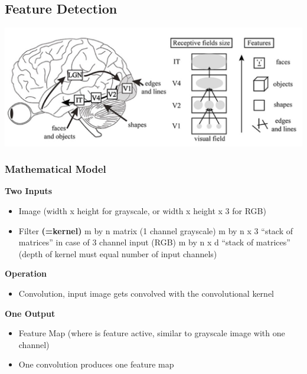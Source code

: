 \documentclass[a4paper, landscape, 10pt]{scrartcl}
\begin{document}
\begin{multicols*}{3}
        \subsection{Feature Detection}
        \includegraphics[width=\columnwidth]{graphic/00-brain-feature-detectors}

        \subsubsection{Mathematical Model}
        \textbf{Two Inputs}
        \begin{itemize}
            \item Image (width x height for grayscale, or width x height x 3 for RGB)
            \item Filter \textbf{(=kernel)}
            \subitem m by n matrix (1 channel grayscale)
            \subitem m by n x 3 \enquote{stack of matrices} in case of 3 channel input (RGB)
            \subitem m by n x d \enquote{stack of matrices} (depth of kernel must equal number of input channels)
        \end{itemize}
        \textbf{Operation}
        \begin{itemize}
            \item Convolution, input image gets convolved with the convolutional kernel
        \end{itemize}
        \textbf{One Output}
        \begin{itemize}
            \item Feature Map (where is feature active, similar to grayscale image with one channel)
            \item One convolution produces one feature map
        \end{itemize}


\end{multicols*}
\end{document}
